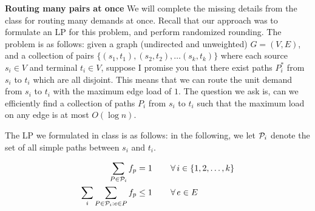 \documentclass[solution,addpoints,12pt]{exam}
\begin{document}
\begin{questions}


\question[15] \textbf{Routing many pairs at once}  We will complete the missing details from the class for routing many demands at once. Recall that our approach was to formulate an LP for this problem, and perform randomized rounding. The problem is as follows: given a graph (undirected and unweighted) $G  = (V,E)$, and a collection of pairs $\{(s_1, t_1), (s_2, t_2), \ldots (s_k, t_k)\}$ where each source $s_i \in V$ and terminal $t_i \in V$, suppose I promise you that there exist paths $P^*_i$ from $s_i$ to $t_i$ which are all disjoint. This means that we can route the unit demand from $s_i$ to $t_i$ with the maximum edge load of $1$.
The question we ask is,  can we efficiently find a collection of paths $P_i$ from $s_i$ to $t_i$ such that the maximum load on any edge is at most $O(\log n)$. 

The LP we formulated in class is as follows: in the following, we let ${\cal P}_i$ denote the set of all simple paths between $s_i$ and $t_i$.

\begin{align*}
\sum_{P \in {\cal P}_i} f_p & = 1  \, \qquad \forall \, i \in \{1, 2, \ldots, k\} \\
\sum_{i} \sum_{P \in {\cal P}_i: e \in P} f_p & \leq 1  \, \qquad \forall \, e \in E
\end{align*}


\end{questions}
\end{document}
